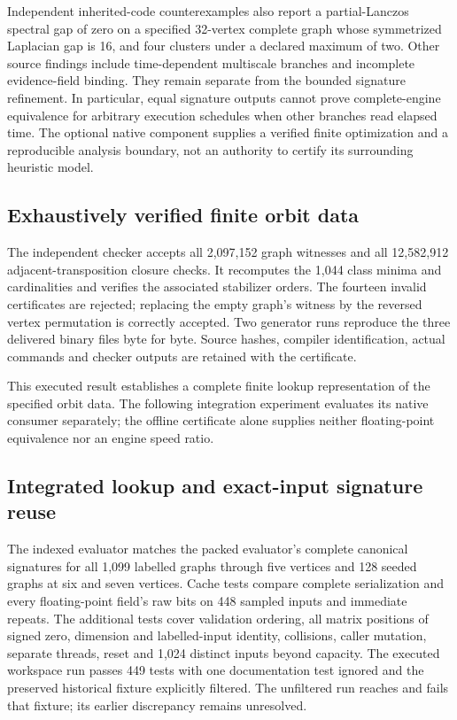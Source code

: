 \documentclass[11pt,a4paper]{article}
\theoremstyle{definition}\newtheorem{definition}[theorem]{Definition}
\begin{document}
Independent inherited-code counterexamples also report a partial-Lanczos spectral gap of zero on a specified 32-vertex complete graph whose symmetrized Laplacian gap is 16, and four clusters under a declared maximum of two. Other source findings include time-dependent multiscale branches and incomplete evidence-field binding. They remain separate from the bounded signature refinement. In particular, equal signature outputs cannot prove complete-engine equivalence for arbitrary execution schedules when other branches read elapsed time. The optional native component supplies a verified finite optimization and a reproducible analysis boundary, not an authority to certify its surrounding heuristic model.

\subsection{Exhaustively verified finite orbit data}\label{sec:indexresults}
The independent checker accepts all 2,097,152 graph witnesses and all 12,582,912 adjacent-transposition closure checks. It recomputes the 1,044 class minima and cardinalities and verifies the associated stabilizer orders. The fourteen invalid certificates are rejected; replacing the empty graph's witness by the reversed vertex permutation is correctly accepted. Two generator runs reproduce the three delivered binary files byte for byte. Source hashes, compiler identification, actual commands and checker outputs are retained with the certificate.

This executed result establishes a complete finite lookup representation of the specified orbit data. The following integration experiment evaluates its native consumer separately; the offline certificate alone supplies neither floating-point equivalence nor an engine speed ratio.

\subsection{Integrated lookup and exact-input signature reuse}\label{sec:indexedintegration}
The indexed evaluator matches the packed evaluator's complete canonical signatures for all 1,099 labelled graphs through five vertices and 128 seeded graphs at six and seven vertices. Cache tests compare complete serialization and every floating-point field's raw bits on 448 sampled inputs and immediate repeats. The additional tests cover validation ordering, all matrix positions of signed zero, dimension and labelled-input identity, collisions, caller mutation, separate threads, reset and 1,024 distinct inputs beyond capacity. The executed workspace run passes 449 tests with one documentation test ignored and the preserved historical fixture explicitly filtered. The unfiltered run reaches and fails that fixture; its earlier discrepancy remains unresolved.
\end{document}
